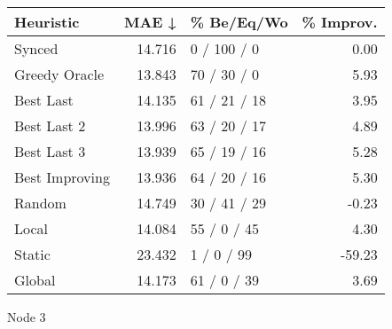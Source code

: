 \begin{tabular}{lrlr}
\toprule
\textbf{Heuristic} & \textbf{MAE ↓} & \textbf{\% Be/Eq/Wo} & \textbf{\% Improv.} \\
\midrule
            Synced &         14.716 &          0 / 100 / 0 &                0.00 \\
     Greedy Oracle &         13.843 &          70 / 30 / 0 &                5.93 \\
         Best Last &         14.135 &         61 / 21 / 18 &                3.95 \\
       Best Last 2 &         13.996 &         63 / 20 / 17 &                4.89 \\
       Best Last 3 &         13.939 &         65 / 19 / 16 &                5.28 \\
    Best Improving &         13.936 &         64 / 20 / 16 &                5.30 \\
            Random &         14.749 &         30 / 41 / 29 &               -0.23 \\
             Local &         14.084 &          55 / 0 / 45 &                4.30 \\
            Static &         23.432 &           1 / 0 / 99 &              -59.23 \\
            Global &         14.173 &          61 / 0 / 39 &                3.69 \\
\bottomrule
\end{tabular}
\caption{Node 3}
\label{tab:iid_lr05_le2_bs4_3}
